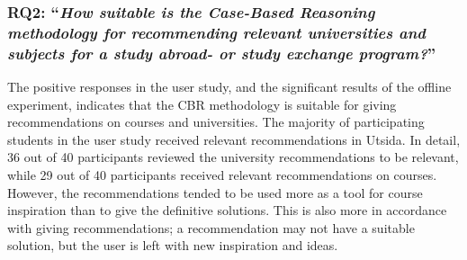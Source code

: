 \subsubsection{RQ2: \enquote{\textit{How suitable is the Case-Based Reasoning methodology for recommending relevant universities and subjects for a study abroad- or study exchange program?}}}

The positive responses in the user study, and the significant results of the offline experiment, indicates that the CBR methodology is suitable for giving recommendations on courses and universities. The majority of participating students in the user study received relevant recommendations in Utsida. In detail, 36 out of 40 participants reviewed the university recommendations to be relevant, while 29 out of 40 participants received relevant recommendations on courses. However, the recommendations tended to be used more as a tool for course inspiration than to give the definitive solutions. This is also more in accordance with giving recommendations; a recommendation may not have a suitable solution, but the user is left with new inspiration and ideas. 